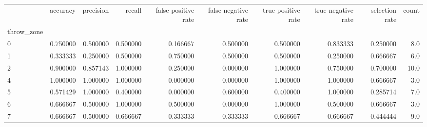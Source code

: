 \begin{tabular}{lrrrrrrrrr}
\toprule
{} &  accuracy &  precision &    recall &  false positive rate &  false negative rate &  true positive rate &  true negative rate &  selection rate &  count \\
throw\_zone &           &            &           &                      &                      &                     &                     &                 &        \\
\midrule
0          &  0.750000 &   0.500000 &  0.500000 &             0.166667 &             0.500000 &            0.500000 &            0.833333 &        0.250000 &    8.0 \\
1          &  0.333333 &   0.250000 &  0.500000 &             0.750000 &             0.500000 &            0.500000 &            0.250000 &        0.666667 &    6.0 \\
2          &  0.900000 &   0.857143 &  1.000000 &             0.250000 &             0.000000 &            1.000000 &            0.750000 &        0.700000 &   10.0 \\
4          &  1.000000 &   1.000000 &  1.000000 &             0.000000 &             0.000000 &            1.000000 &            1.000000 &        0.666667 &    3.0 \\
5          &  0.571429 &   1.000000 &  0.400000 &             0.000000 &             0.600000 &            0.400000 &            1.000000 &        0.285714 &    7.0 \\
6          &  0.666667 &   0.500000 &  1.000000 &             0.500000 &             0.000000 &            1.000000 &            0.500000 &        0.666667 &    3.0 \\
7          &  0.666667 &   0.500000 &  0.666667 &             0.333333 &             0.333333 &            0.666667 &            0.666667 &        0.444444 &    9.0 \\
\bottomrule
\end{tabular}
